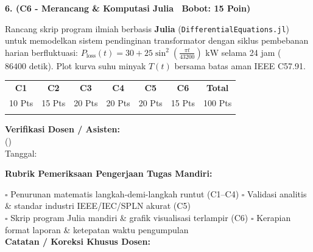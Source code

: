\documentclass[10pt,a4paper]{article}
\begin{document}
\vspace{3.5mm}

\noindent\textbf{6. (C6 - Merancang \& Komputasi Julia \textbar\ Bobot: 15 Poin)}\par\vspace{0.8mm}
{\footnotesize Rancang skrip program ilmiah berbasis \textbf{Julia} (\texttt{Differential\-Equations.jl}) untuk memodelkan sistem pendinginan transformator dengan siklus pembebanan harian berfluktuasi: $P_{\text{loss}}(t) = 30 + 25\sin^2(\frac{\pi t}{43200})\text{ kW}$ selama 24 jam ($86400\text{ detik}$). Plot kurva suhu minyak $T(t)$ bersama batas aman IEEE C57.91.}\par

\vfill

\noindent\begin{minipage}[b]{0.62\textwidth}%
  \centering
  \scriptsize
  \begin{tabular}{|c|c|c|c|c|c|c|}
    \hline
    \rowcolor{unibblue}
    \textbf{\color{white}C1} & \textbf{\color{white}C2} & \textbf{\color{white}C3} & \textbf{\color{white}C4} & \textbf{\color{white}C5} & \textbf{\color{white}C6} & \textbf{\color{white}Total} \\
    \rowcolor{unibblue!10}
    10 Pts & 15 Pts & 20 Pts & 20 Pts & 20 Pts & 15 Pts & 100 Pts \\
    \hline
    & & & & & & \\[3mm]
    \hline
  \end{tabular}%
\end{minipage}%
\hfill%
\begin{minipage}[b]{0.35\textwidth}%
  \centering
  \scriptsize
  \textbf{Verifikasi Dosen / Asisten:}\\[6mm]
  (\dotfill)\\[1mm]
  \tiny Tanggal: \dotfill
\end{minipage}\par

\vspace{2mm}
\begin{tcolorbox}[colback=white,colframe=unibblue!40!black,colbacktitle=unibblue!10,coltitle=unibblue,boxrule=0.5pt,arc=2pt,left=5pt,right=5pt,top=3pt,bottom=3pt,title=\textbf{\tiny Catatan Evaluasi \& Umpan Balik Dosen Pengampu}]
  \tiny
  \textbf{Rubrik Pemeriksaan Pengerjaan Tugas Mandiri:}\par\vspace{0.8mm}
  $\square$ Penurunan matematis langkah-demi-langkah runtut (C1--C4) \hfill $\square$ Validasi analitis \& standar industri IEEE/IEC/SPLN akurat (C5)\\[0.8mm]
  $\square$ Skrip program Julia mandiri \& grafik visualisasi terlampir (C6) \hfill $\square$ Kerapian format laporan \& ketepatan waktu pengumpulan\\[2.0mm]
  \textbf{Catatan / Koreksi Khusus Dosen:}\\[1.6cm]
\end{tcolorbox}
\end{document}
